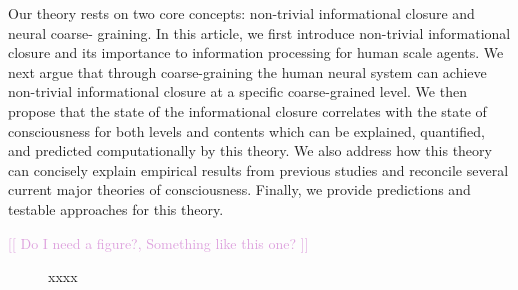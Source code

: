 \documentclass[utf8]{article}
\newcommand{\rewrite}[1]{\textcolor{ForestGreen}{\textit{"#1"}}\newline}
\newcommand{\toWrite}[1]{\noindent
			\textcolor{Orange}{\textbf{[[ #1 ]]}}}
\newcommand{\includegraphicsTodo}[2][]{%
			\tcbox[%
				adjusted title=\LARGE To Be Modified,
				halign title=right,
				colbacktitle=Orange!75!White,
				coltitle=Black,
				colframe=Red!60!White,
				boxrule=1mm,
				colback=white%
				]{\texttt{[image: \#2]}}}
\newcommand{\needref}[1]{%
			\ifthenelse{\equal{#1}{}}{%
				\todo[color=White, linecolor=Orange, bordercolor=Orange]{\textcolor{Orange}{Ref}}}{%
				\todo[color=White, linecolor=Orange, bordercolor=Orange]{\textcolor{Orange}{Ref: #1}}%
			}%
		}
\newcommand{\idea}[2][Plum]{\noindent
				\textcolor{#1}{[[ #2 ]]}}
\begin{document}
			
		Our theory rests on two core concepts: non-trivial informational closure and neural coarse- graining. In this article, we first introduce non-trivial informational closure and its importance to information processing for human scale agents. We next argue that through coarse-graining the human neural system can achieve non-trivial informational closure at a specific coarse-grained level. We then propose that the state of the informational closure correlates with the state of consciousness for both levels and contents which can be explained, quantified, and predicted computationally by this theory. We also address how this theory can concisely explain empirical results from previous studies and reconcile several current major theories of consciousness. Finally, we provide predictions and testable approaches for this theory.


		\idea{Do I need a figure?, Something like this one?}
		\begin{figure}[H]
			\includegraphicsTodo[width=\textwidth/2]{WritingMaterials/PDFXCview_2018-06-11_13-37-34.png}
			\cite{pennartz2017consciousness}
			\caption{xxxx}
	   	\end{figure}
				
	
		

	
\end{document}
